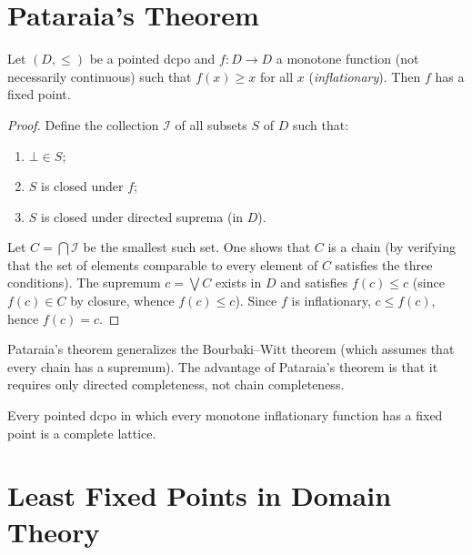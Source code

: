 \section{Pataraia's Theorem}

\begin{theorem}[Pataraia]
\label{thm:pataraia}
Let $(D, \leq)$ be a pointed dcpo and $f\colon D \to D$ a monotone function (not
necessarily continuous) such that $f(x) \geq x$ for all $x$ (\emph{inflationary}). Then
$f$ has a fixed point.
\end{theorem}

\begin{proof}
Define the collection $\mathcal{I}$ of all subsets $S$ of $D$ such that:
\begin{enumerate}
  \item $\bot \in S$;
  \item $S$ is closed under $f$;
  \item $S$ is closed under directed suprema (in $D$).
\end{enumerate}
Let $C = \bigcap \mathcal{I}$ be the smallest such set. One shows that $C$ is a chain (by
verifying that the set of elements comparable to every element of $C$ satisfies the three
conditions). The supremum $c = \bigvee C$ exists in $D$ and satisfies $f(c) \leq c$ (since
$f(c) \in C$ by closure, whence $f(c) \leq c$). Since $f$ is inflationary, $c \leq f(c)$,
hence $f(c) = c$.
\end{proof}

\begin{remark}
Pataraia's theorem generalizes the Bourbaki--Witt theorem (which assumes that every chain
has a supremum). The advantage of Pataraia's theorem is that it requires only directed
completeness, not chain completeness.
\end{remark}

\begin{corollary}
Every pointed dcpo in which every monotone inflationary function has a fixed point is a
complete lattice.
\end{corollary}

\section{Least Fixed Points in Domain Theory}

